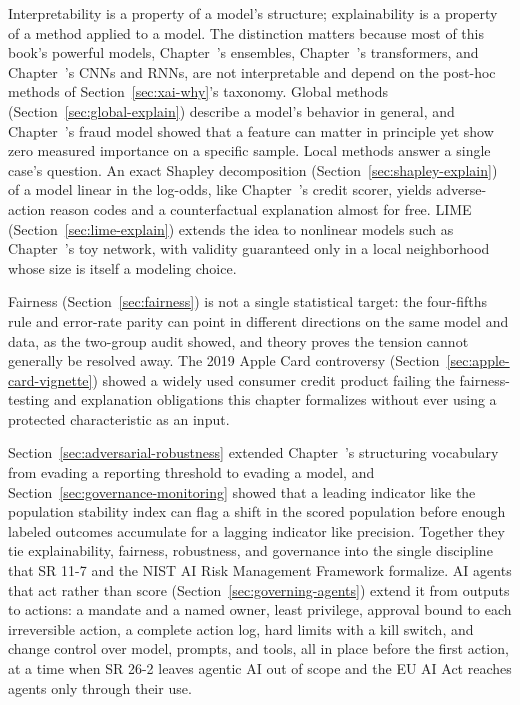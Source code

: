 \documentclass[../ai_in_finance]{subfiles}
\begin{document}

Interpretability is a property of a model's structure; explainability is a property of a method applied to a model. The distinction matters because most of this book's powerful models, Chapter~'s ensembles, Chapter~'s transformers, and Chapter~'s CNNs and RNNs, are not interpretable and depend on the post-hoc methods of Section~\ref{sec:xai-why}'s taxonomy. Global methods (Section~\ref{sec:global-explain}) describe a model's behavior in general, and Chapter~'s fraud model showed that a feature can matter in principle yet show zero measured importance on a specific sample. Local methods answer a single case's question. An exact Shapley decomposition (Section~\ref{sec:shapley-explain}) of a model linear in the log-odds, like Chapter~'s credit scorer, yields adverse-action reason codes and a counterfactual explanation almost for free. LIME (Section~\ref{sec:lime-explain}) extends the idea to nonlinear models such as Chapter~'s toy network, with validity guaranteed only in a local neighborhood whose size is itself a modeling choice.

Fairness (Section~\ref{sec:fairness}) is not a single statistical target: the four-fifths rule and error-rate parity can point in different directions on the same model and data, as the two-group audit showed, and theory proves the tension cannot generally be resolved away. The 2019 Apple Card controversy (Section~\ref{sec:apple-card-vignette}) showed a widely used consumer credit product failing the fairness-testing and explanation obligations this chapter formalizes without ever using a protected characteristic as an input.

Section~\ref{sec:adversarial-robustness} extended Chapter~'s structuring vocabulary from evading a reporting threshold to evading a model, and Section~\ref{sec:governance-monitoring} showed that a leading indicator like the population stability index can flag a shift in the scored population before enough labeled outcomes accumulate for a lagging indicator like precision. Together they tie explainability, fairness, robustness, and governance into the single discipline that SR 11-7 and the NIST AI Risk Management Framework formalize. AI agents that act rather than score (Section~\ref{sec:governing-agents}) extend it from outputs to actions: a mandate and a named owner, least privilege, approval bound to each irreversible action, a complete action log, hard limits with a kill switch, and change control over model, prompts, and tools, all in place before the first action, at a time when SR 26-2 leaves agentic AI out of scope and the EU AI Act reaches agents only through their use.
\end{document}
